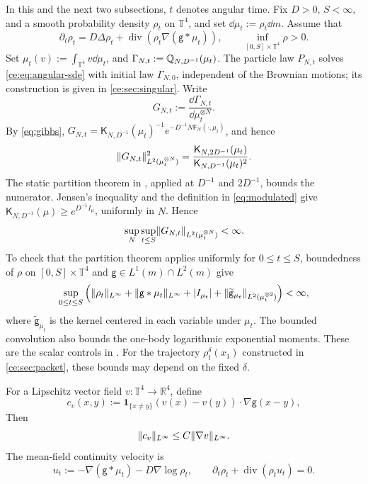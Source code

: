 \documentclass[11pt,reqno]{amsart}
\numberwithin{equation}{section}
\theoremstyle{plain}
\theoremstyle{remark}
\DeclarePairedDelimiter{\norm}{\lVert}{\rVert}
\newcommand{\T}{\mathbb T}\newcommand{\R}{\mathbb R}\newcommand{\Z}{\mathbb Z}
\newcommand{\K}{\mathsf K}\newcommand{\g}{\mathsf g}\newcommand{\Fr}{\mathsf F}
\DeclareMathOperator{\diver}{div}
\begin{document}
In this and the next two subsections, $t$ denotes angular time. Fix $D>0$, $S<\infty$, and a smooth probability density $\rho_t$ on $\T^4$, and set $\dd\mu_t:=\rho_t\dd m$. Assume that
\begin{equation}\label{ce:eq:four-dimensional-background}
 \partial_t\rho_t=D\Delta\rho_t+\diver(\rho_t\nabla(\g*\mu_t)),
 \qquad \inf_{[0,S]\times\T^4}\rho>0.
\end{equation}
Set $\mu_t(v):=\int_{\T^4}v\dd\mu_t$, and $\Gamma_{N,t}:=\mathbb Q_{N,D^{-1}}(\mu_t)$. The particle law $P_{N,t}$ solves \eqref{ce:eq:angular-sde} with initial law $\Gamma_{N,0}$, independent of the Brownian motions; its construction is given in \cref{ce:sec:singular}. Write
\begin{equation}\label{ce:eq:G}
 G_{N,t}:=\frac{\dd\Gamma_{N,t}}{\dd\mu_t^{\otimes N}}.
\end{equation}
By \eqref{eq:gibbs}, $G_{N,t}=\K_{N,D^{-1}}(\mu_t)^{-1}e^{-D^{-1}N\Fr_N(\cdot,\mu_t)}$, and hence
\begin{equation}\label{ce:eq:G2partition}
 \norm{G_{N,t}}_{L^2(\mu_t^{\otimes N})}^2
 =\frac{\K_{N,2D^{-1}}(\mu_t)}
 {\K_{N,D^{-1}}(\mu_t)^2}.
\end{equation}
The static partition theorem in \cite[Theorem 2.2(i), Remark 2.1]{DGRpartition}, applied at $D^{-1}$ and $2D^{-1}$, bounds the numerator. Jensen's inequality and the definition in \eqref{eq:modulated} give
$\K_{N,D^{-1}}(\mu)\ge e^{D^{-1}I_\mu}$, uniformly in $N$. Hence
\begin{equation}\label{ce:eq:staticG2}
 \sup_N\sup_{t\le S}\norm{G_{N,t}}_{L^2(\mu_t^{\otimes N})}<\infty.
\end{equation}
To check that the partition theorem applies uniformly for $0\le t\le S$, boundedness of $\rho$ on $[0,S]\times\T^4$ and $\g\in L^1(m)\cap L^2(m)$ give
\begin{equation}\label{ce:eq:static-trajectory-controls}
 \sup_{0\le t\le S}\left(\norm{\rho_t}_{L^\infty}+\norm{\g*\mu_t}_{L^\infty}
 +|I_{\mu_t}|+\norm{\widetilde{\g}_{\mu_t}}_{L^2(\mu_t^{\otimes2})}\right)<\infty,
\end{equation}
where $\widetilde{\g}_{\mu_t}$ is the kernel centered in each variable under $\mu_t$. The bounded convolution also bounds the one-body logarithmic exponential moments. These are the scalar controls in \cite[Appendix~A]{DGRpartition}. For the trajectory $\rho^\delta_t(x_1)$ constructed in \cref{ce:sec:packet}, these bounds may depend on the fixed $\delta$.

For a Lipschitz vector field $v:\T^4\to\R^4$, define
\begin{equation}\label{ce:eq:cvector}
 c_v(x,y):=\mathbf1_{\{x\ne y\}}(v(x)-v(y))\cdot\nabla\g(x-y),
\end{equation}
Then
\begin{equation}\label{ce:eq:commutator-sup-bound}
 \norm{c_v}_{L^\infty}\le C\norm{\nabla v}_{L^\infty}.
\end{equation}
 The mean-field continuity velocity is
\begin{equation}\label{ce:eq:angular-continuity-velocity}
 u_t:=-\nabla(\g*\mu_t)-D\nabla\log\rho_t,
 \qquad \partial_t\rho_t+\diver(\rho_tu_t)=0.
\end{equation}
\end{document}
